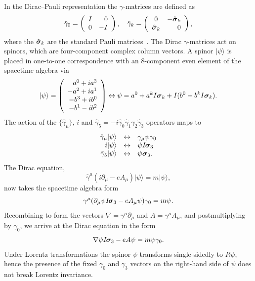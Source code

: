 \documentclass[a4paper]{article}
\numberwithin{equation}{section}
\newcommand{\ra}{\rangle}
\newcommand{\lra}{\leftrightarrow}
\newcommand{\gam}{\gamma}
\newcommand{\sig}{\mbox{\boldmath $\sigma$}}
\newcommand{\bsig}{\mbox{\boldmath $\sig$}}
\newcommand{\dmu}{\partial_{\mu}}
\newcommand{\sk}{\bsig_3}
\newcommand{\isk}{I \hspace{-1pt} \bsig_3}
\newcommand{\gk}{\gamma_{3}}
\newcommand{\go}{\gamma_{0}}
\newcommand{\gamum}{\gamma^\mu}
\newcommand{\gamdm}{\gamma_\mu}
\newcommand{\hgi}{\hat{\gamma}_{1}}
\newcommand{\hgj}{\hat{\gamma}_{2}}
\newcommand{\hgk}{\hat{\gamma}_{3}}
\newcommand{\hgo}{\hat{\gamma}_{0}}
\newcommand{\hgamum}{\hat{\gamma}^\mu}
\newcommand{\hgamdm}{\hat{\gamma}_\mu}
\newcommand{\grad}{\nabla}
\begin{document}
In the Dirac--Pauli representation the $\gamma$-matrices are defined as
%
\begin{equation}
\hat{\gamma}_0 = \left( \begin{array}{cr}
        I & 0 \\
        0 & -I
      \end{array} \right) , \quad
\hat{\gamma}_k = \left( \begin{array}{cr}
        0 & -\hat{\sig}_k \\
        \hat{\sig}_k & 0
      \end{array} \right) ,
\end{equation}
%
where the $\hat{\sig}_k$ are the standard Pauli
matrices~\cite{bjo-rel1,itz-quant}.  The Dirac $\gam$-matrices act on
spinors, which are four-component complex column vectors.  A spinor
$|\psi \ra$ is placed in one-to-one correspondence with an 8-component
even element of the spacetime algebra
via~\cite{DGL93-states,gul-steps}
%
\begin{equation}
|\psi\ra = \left( \begin{array}{r} 
 a^0 + ia^3  \\
-a^2 + ia^1  \\
-b^3 + ib^0  \\
-b^1 - ib^2
\end{array} \right) \lra \psi = a^0 + a^k I\sig_k + I(b^0 + b^k I\sig_k).
\end{equation}
%
The action of the $\{\hgamdm\}$, $i$ and
$\hat{\gam}_5=-i\hgo\hgi\hgj\hgk$ operators maps to
%
\begin{equation}
\begin{array}{rcl}
\hgamdm |\psi\ra & \lra & \gamdm \psi \gamma_0 \\
i |\psi\ra & \lra & \psi \isk \\
\hat{\gamma}_{5}  |\psi\ra & \lra & \psi  \sk.
\end{array}
\end{equation}
%
The Dirac equation,
%
\begin{equation}
\hgamum(i \partial_\mu - e A_\mu) |\psi\ra
 = m |\psi\ra ,
\end{equation}
%
now takes the spacetime algebra form
%
\begin{equation}
\gamum(\dmu \psi \isk - eA_\mu \psi) \go = m \psi.
\end{equation}
%
Recombining to form the vectors $\grad=\gamum\dmu$ and $A=\gamum
A_\mu$, and postmultiplying by $\go$, we arrive at the Dirac equation
in the form
%
\begin{equation}
\grad \psi \isk - eA \psi = m \psi \go.
\end{equation}
%
Under Lorentz transformations the spinor $\psi$ transforms
single-sidedly to $R\psi$, hence the presence of the fixed $\go$ and
$\gk$ vectors on the right-hand side of $\psi$ does not break Lorentz
invariance.
\end{document}
